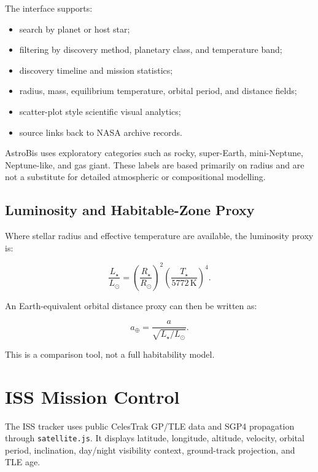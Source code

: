 \documentclass[11pt,a4paper]{article}
\begin{document}
The interface supports:

\begin{itemize}[leftmargin=*]
  \item search by planet or host star;
  \item filtering by discovery method, planetary class, and temperature band;
  \item discovery timeline and mission statistics;
  \item radius, mass, equilibrium temperature, orbital period, and distance fields;
  \item scatter-plot style scientific visual analytics;
  \item source links back to NASA archive records.
\end{itemize}

AstroBis uses exploratory categories such as rocky, super-Earth, mini-Neptune, Neptune-like, and gas giant. These labels are based primarily on radius and are not a substitute for detailed atmospheric or compositional modelling.

\subsection{Luminosity and Habitable-Zone Proxy}

Where stellar radius and effective temperature are available, the luminosity proxy is:

\begin{equation}
\frac{L_\star}{L_\odot}
=
\left(\frac{R_\star}{R_\odot}\right)^2
\left(\frac{T_\star}{5772\,\mathrm{K}}\right)^4.
\end{equation}

An Earth-equivalent orbital distance proxy can then be written as:

\begin{equation}
a_\oplus=\frac{a}{\sqrt{L_\star/L_\odot}}.
\end{equation}

This is a comparison tool, not a full habitability model.

\section{ISS Mission Control}

The ISS tracker uses public CelesTrak GP/TLE data and SGP4 propagation through \texttt{satellite.js}. It displays latitude, longitude, altitude, velocity, orbital period, inclination, day/night visibility context, ground-track projection, and TLE age.
\end{document}
